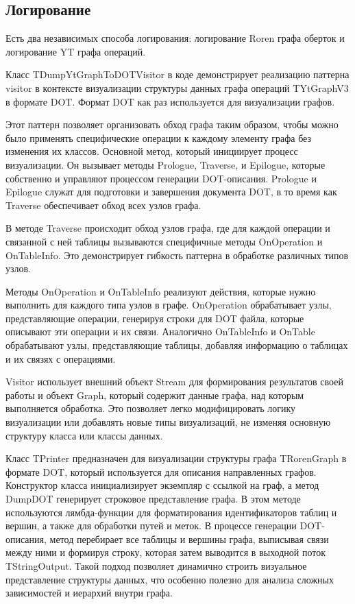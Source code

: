 \subsection{Логирование}

Есть два независимых способа логирования: логирование Roren графа оберток и логирование YT графа операций.

Класс TDumpYtGraphToDOTVisitor в коде демонстрирует реализацию паттерна visitor в контексте визуализации структуры данных графа операций TYtGraphV3 в формате DOT. Формат DOT как раз используется для визуализации графов.

Этот паттерн позволяет организовать обход графа таким образом, чтобы можно было применять специфические операции к каждому элементу графа без изменения их классов. Основной метод, который инициирует процесс визуализации. Он вызывает методы Prologue, Traverse, и Epilogue, которые собственно и управляют процессом генерации DOT-описания. Prologue и Epilogue служат для подготовки и завершения документа DOT, в то время как Traverse обеспечивает обход всех узлов графа.

В методе Traverse происходит обход узлов графа, где для каждой операции и связанной с ней таблицы вызываются специфичные методы OnOperation и OnTableInfo. Это демонстрирует гибкость паттерна в обработке различных типов узлов.

Методы OnOperation и OnTableInfo реализуют действия, которые нужно выполнить для каждого типа узлов в графе. OnOperation обрабатывает узлы, представляющие операции, генерируя строки для DOT файла, которые описывают эти операции и их связи. Аналогично OnTableInfo и OnTable обрабатывают узлы, представляющие таблицы, добавляя информацию о таблицах и их связях с операциями.

Visitor использует внешний объект Stream для формирования результатов своей работы и объект Graph, который содержит данные графа, над которым выполняется обработка. Это позволяет легко модифицировать логику визуализации или добавлять новые типы визуализаций, не изменяя основную структуру класса или классы данных.

Класс TPrinter предназначен для визуализации структуры графа TRorenGraph в формате DOT, который используется для описания направленных графов. Конструктор класса инициализирует экземпляр с ссылкой на граф, а метод DumpDOT генерирует строковое представление графа. В этом методе используются лямбда-функции для форматирования идентификаторов таблиц и вершин, а также для обработки путей и меток. В процессе генерации DOT-описания, метод перебирает все таблицы и вершины графа, выписывая связи между ними и формируя строку, которая затем выводится в выходной поток TStringOutput. Такой подход позволяет динамично строить визуальное представление структуры данных, что особенно полезно для анализа сложных зависимостей и иерархий внутри графа.
